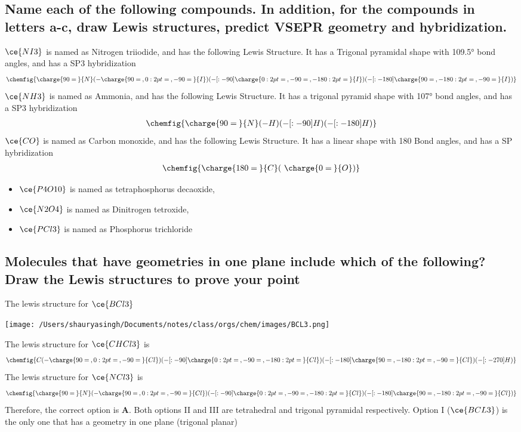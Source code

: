 \documentclass{scrartcl}
\begin{document}
\subsection{Name each of the following compounds. In addition, for the compounds in letters a-c, draw Lewis structures, predict VSEPR geometry and hybridization.}
\label{sec:org2e1974b}
\(\ce{NI3}\) is named as Nitrogen triiodide, and has the following Lewis Structure. It has a Trigonal pyramidal shape with 109.5° bond angles, and has a SP3 hybridization
\begin{align}
\chemfig{\charge{90=\:}{N}(-\charge{90=\:, 0:2pt=\:, -90=\:}{I})(-[:-90]\charge{0:2pt=\:, -90=\:, -180:2pt=\:}{I})(-[:-180]\charge{90=\:, -180:2pt=\:, -90=\:}{I})}
\end{align}
\(\ce{NH3}\) is named as Ammonia, and has the following Lewis Structure. It has a trigonal pyramid shape with 107° bond angles, and has a SP3 hybridization
\begin{align}
\chemfig{\charge{90=\:}{N}(-{H})(-[:-90]{H})(-[:-180]{H})}
\end{align}
\(\ce{CO}\) is named as Carbon monoxide, and has the following Lewis Structure. It has a linear shape with 180\textdegree{} Bond angles, and has a SP hybridization
\begin{align}
\chemfig{\charge{180=\:}{C}(~\charge{0=\:}{O})}
\end{align}
\begin{itemize}
\item \(\ce{P4O10}\) is named as tetraphosphorus decaoxide,
\item \(\ce{N2O4}\) is named as Dinitrogen tetroxide,
\item \(\ce{PCl3}\) is named as Phosphorus trichloride
\end{itemize}

\subsection{Molecules that have geometries in one plane include which of the following? Draw the Lewis structures to prove your point}
\label{sec:org7acb9d2}
The lewis structure for \(\ce{BCl3}\)
\begin{center}
\texttt{[image: /Users/shauryasingh/Documents/notes/class/orgs/chem/images/BCL3.png]}
\end{center}
The lewis structure for \(\ce{CHCl3}\) is
\begin{align}
\chemfig{{C}(-\charge{90=\:, 0:2pt=\:, -90=\:}{Cl})(-[:-90]\charge{0:2pt=\:, -90=\:, -180:2pt=\:}{Cl})(-[:-180]\charge{90=\:, -180:2pt=\:, -90=\:}{Cl})(-[:-270]{H})}
\end{align}
The lewis structure for \(\ce{NCl3}\) is
\begin{align}
\chemfig{\charge{90=\:}{N}(-\charge{90=\:, 0:2pt=\:, -90=\:}{Cl})(-[:-90]\charge{0:2pt=\:, -90=\:, -180:2pt=\:}{Cl})(-[:-180]\charge{90=\:, -180:2pt=\:, -90=\:}{Cl})}
\end{align}
Therefore, the correct option is \textbf{A}. Both options II and III are tetrahedral and trigonal pyramidal respectively. Option I (\(\ce{BCL3}\)) is the only one that has a geometry in one plane (trigonal planar)
\end{document}

